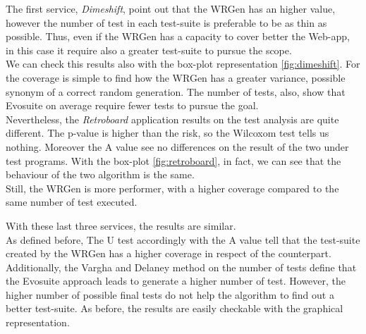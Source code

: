 The first service, \emph{Dimeshift}, point out that the WRGen has an higher value, however the number of test in each test-suite is preferable to be as thin as possible.
Thus, even if the WRGen has a capacity to cover better the Web-app, in this case it require also a greater test-suite to pursue the scope.\\
We can check this results also with the box-plot representation \ref{fig:dimeshift}.
For the coverage is simple to find how the WRGen has a greater variance, possible synonym of a correct random generation.
The number of tests, also, show that Evosuite on average require fewer tests to pursue the goal.\\
Nevertheless, the \emph{Retroboard} application results on the test analysis are quite different.
The p-value is higher than the risk, so the Wilcoxom test tells us nothing.
Moreover the A value see no differences on the result of the two under test programs.
With the box-plot \ref{fig:retroboard}, in fact, we can see that the behaviour of the two algorithm is the same.\\
Still, the WRGen is more performer, with a higher coverage compared to the same number of test executed.
\begin{figure}[H]
	\centering
	
	
\end{figure}
\begin{figure}[H]
	\centering
	
\end{figure}
With these last three services, the results are similar.\\
As defined before, The U test accordingly with the A value tell that the test-suite created by the WRGen has a higher coverage in respect of the counterpart.\\
Additionally, the Vargha and Delaney method on the number of tests define that the Evosuite approach leads to generate a higher number of test.
However, the higher number of possible final tests do not help the algorithm to find out a better test-suite.
As before, the results are easily checkable with the graphical representation.
\newpage